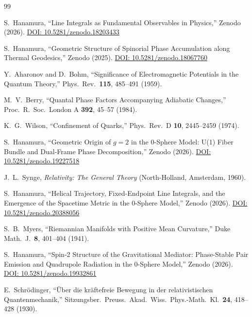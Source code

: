 \documentclass[%
 reprint, amsmath,amssymb, aps, prd, ]{revtex4-2}
\numberwithin{equation}{section}
\begin{document}
\begin{thebibliography}{99}


S.~Hanamura, ``Line Integrals as Fundamental Observables in Physics,'' Zenodo (2026). \href{https://doi.org/10.5281/zenodo.18203433}{DOI: 10.5281/zenodo.18203433}

S.~Hanamura, ``Geometric Structure of Spinorial Phase Accumulation along Thermal Geodesics,'' Zenodo (2025). \href{https://doi.org/10.5281/zenodo.18067760}{DOI: 10.5281/zenodo.18067760}

Y.~Aharonov and D.~Bohm, ``Significance of Electromagnetic Potentials in the Quantum Theory,'' Phys.\ Rev.\ \textbf{115}, 485--491 (1959).

M.~V.~Berry, ``Quantal Phase Factors Accompanying Adiabatic Changes,'' Proc.\ R.\ Soc.\ London A \textbf{392}, 45--57 (1984).

K.~G.~Wilson, ``Confinement of Quarks,'' Phys.\ Rev.\ D \textbf{10}, 2445--2459 (1974).

S.~Hanamura, ``Geometric Origin of $g=2$ in the 0-Sphere Model: U(1) Fiber Bundle and Dual-Frame Phase Decomposition,'' Zenodo (2026). \href{https://doi.org/10.5281/zenodo.19227518}{DOI: 10.5281/zenodo.19227518}

J.~L.~Synge, \textit{Relativity: The General Theory} (North-Holland, Amsterdam, 1960).

S.~Hanamura, ``Helical Trajectory, Fixed-Endpoint Line Integrals, and the Emergence of the Spacetime Metric in the 0-Sphere Model,'' Zenodo (2026). \href{https://doi.org/10.5281/zenodo.20388056}{DOI: 10.5281/zenodo.20388056}

S.~B.~Myers, ``Riemannian Manifolds with Positive Mean Curvature,'' Duke Math.\ J.\ \textbf{8}, 401--404 (1941).

S.~Hanamura, ``Spin-2 Structure of the Gravitational Mediator: Phase-Stable Pair Emission and Quadrupole Radiation in the 0-Sphere Model,'' Zenodo (2026). \href{https://doi.org/10.5281/zenodo.19932861}{DOI: 10.5281/zenodo.19932861}

E.~Schr\"{o}dinger, ``\"{U}ber die kr\"{a}ftefreie Bewegung in der relativistischen Quantenmechanik,'' Sitzungsber.\ Preuss.\ Akad.\ Wiss.\ Phys.-Math.\ Kl.\ \textbf{24}, 418--428 (1930).


\end{thebibliography}
\end{document}
